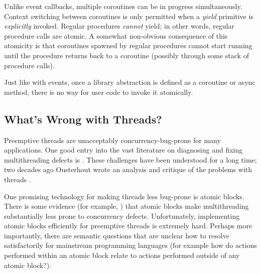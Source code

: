 \documentclass[preprint, 10pt, numbers]{sigplanconf}
\begin{document}
Unlike event callbacks, multiple coroutines can be in progress simultaneously.
Context switching between coroutines is only permitted when a \emph{yield} primitive is \emph{explicitly} invoked.
Regular procedures \emph{cannot} yield; in other words, regular procedure calls are atomic.
A somewhat non-obvious consequence of this atomicity is that coroutines spawned by regular procedures cannot start running until the procedure returns back to a coroutine (possibly through some stack of procedure calls).

Just like with events, once a library abstraction is defined as a coroutine or async method, there is no way for user code to invoke it atomically.

\subsection{What's Wrong with Threads?}

Preemptive threads are unacceptably concurrency-bug-prone for many applications.
One good entry into the vast literature on diagnosing and fixing multithreading defects is \cite{Lu2008}.
These challenges have been understood for a long time; two decades ago Ousterhout wrote an analysis and critique of the problems with threads \cite{Ousterhout1996}.

One promising technology for making threads less bug-prone is atomic blocks.
There is some evidence (for example, \cite{Harris2005, Grossman2007, Pankratius2014}) that atomic blocks make multithreading substantially less prone to concurrency defects.
Unfortunately, implementing atomic blocks efficiently for preemptive threads is extremely hard.
Perhaps more importantly, there are semantic questions that are unclear how to resolve satisfactorily for mainstream programming languages (for example how do actions performed within an atomic block relate to actions performed outside of any atomic block?).


\end{document}
